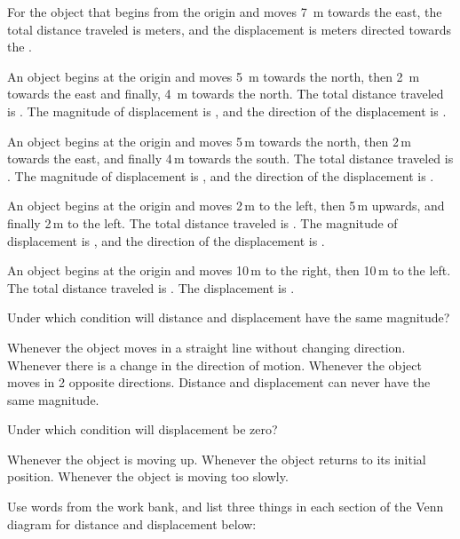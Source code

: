 \documentclass[answers]{exam}
\begin{document}
\begin{questions}
\question
For the object that begins from the origin and moves \SI{7}{m} towards the east, the total distance traveled is \fillin[7] meters, and the displacement is \fillin[7] meters directed towards the \fillin[east].


\question
An object begins at the origin and moves \SI{5}{m} towards the north, then \SI{2}{m} towards the east and finally, \SI{4}
{m} towards the north. The total distance traveled is \fillin[]. The magnitude of displacement is \fillin[], and the direction of the displacement is \fillin[].

\question
An object begins at the origin and moves 5\,m towards the north, then 2\,m towards the east, and finally 4\,m towards the south. The total distance traveled is \fillin[]. The magnitude of displacement is \fillin[], and the direction of the displacement is \fillin[].


\question
An object begins at the origin and moves 2\,m to the left, then 5\,m upwards, and finally 2\,m to the left. The total distance traveled is \fillin[]. The magnitude of displacement is \fillin[], and the direction of the displacement is \fillin[].


\question
An object begins at the origin and moves 10\,m to the right, then 10\,m to the left. The total distance traveled is \fillin[\SI{20}{m}]. The displacement is \fillin[\SI{0}{m}].

\question
Under which condition will distance and displacement have the same magnitude?

\begin{randomizechoices}[keeplast]
    \correctchoice Whenever the object moves in a straight line without changing direction.
    \choice Whenever there is a change in the direction of motion.
    \choice Whenever the object moves in 2 opposite directions.
    \choice Distance and displacement can never have the same magnitude.
\end{randomizechoices}

\question
Under which condition will displacement be zero?

\begin{randomizechoices}
    \choice Whenever the object is moving up.
    \correctchoice Whenever the object returns to its initial position.
    \choice Whenever the object is moving too slowly.
\end{randomizechoices}

\question
Use words from the work bank, and list three things in each section of the Venn diagram for distance and displacement below:


\end{questions}
\end{document}
